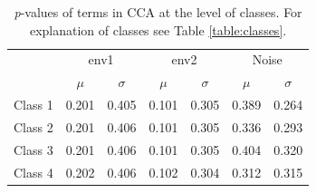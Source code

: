 		\begin{table}[h!] 
			
			\small	
			\caption{\textit{p}-values of terms in CCA at the level of classes. For explanation of classes see Table \ref{table:classes}.}
			\centering
			
			\begin{tabular}{@{}lcccccc@{}}
				
				\toprule
				
				& \multicolumn{2}{c}{env1} & \multicolumn{2}{c}{env2} & \multicolumn{2}{c}{Noise}\\\cmidrule(l){2-3} \cmidrule(l){4-5} \cmidrule(l){6-7}
				& $\mu$ & $\sigma$ & $\mu$ & $\sigma$ & $\mu$ & $\sigma$\\
				\hline
				Class 1 & 0.201 & 0.405 & 0.101 & 0.305 & 0.389 & 0.264\\ %
				Class 2 & 0.201 & 0.406 & 0.101 & 0.305 & 0.336 & 0.293\\ %
				Class 3 & 0.201 & 0.406 & 0.101 & 0.305 & 0.404 & 0.320\\ %
				Class 4 & 0.202 & 0.406 & 0.102 & 0.304 & 0.312 & 0.315\\ %
				\toprule
				
			\end{tabular}
			
			\label{tab:ccasm1}
			
		\end{table}    
		    
